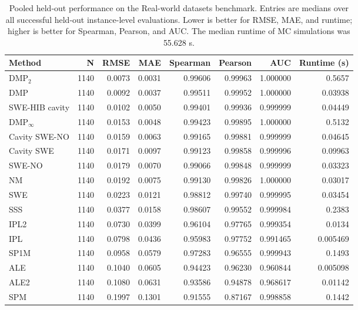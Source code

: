 \begin{table}[t]
\caption{Pooled held-out performance on the Real-world datasets benchmark. Entries are medians over all successful held-out instance-level evaluations. Lower is better for RMSE, MAE, and runtime; higher is better for Spearman, Pearson, and AUC. The median runtime of MC simulations was 55.628 s.}
\label{tab:real_world-pooled-metrics}
\begin{tabular}{lrrrrrrr}
\toprule
Method & N & RMSE & MAE & Spearman & Pearson & AUC & Runtime (s) \\
\midrule
DMP$_2$ & 1140 & 0.0073 & 0.0031 & 0.99606 & 0.99963 & 1.000000 & 0.5657 \\
DMP & 1140 & 0.0092 & 0.0037 & 0.99511 & 0.99952 & 1.000000 & 0.03938 \\
SWE-HIB cavity & 1140 & 0.0102 & 0.0050 & 0.99401 & 0.99936 & 0.999999 & 0.04449 \\
DMP$_{\infty}$ & 1140 & 0.0153 & 0.0048 & 0.99423 & 0.99895 & 1.000000 & 0.5132 \\
Cavity SWE-NO & 1140 & 0.0159 & 0.0063 & 0.99165 & 0.99881 & 0.999999 & 0.04645 \\
Cavity SWE & 1140 & 0.0171 & 0.0097 & 0.99123 & 0.99858 & 0.999996 & 0.09963 \\
SWE-NO & 1140 & 0.0179 & 0.0070 & 0.99066 & 0.99848 & 0.999999 & 0.03323 \\
NM & 1140 & 0.0192 & 0.0075 & 0.99130 & 0.99826 & 1.000000 & 0.03017 \\
SWE & 1140 & 0.0223 & 0.0121 & 0.98812 & 0.99740 & 0.999995 & 0.03454 \\
SSS & 1140 & 0.0377 & 0.0158 & 0.98607 & 0.99552 & 0.999984 & 0.2383 \\
IPL2 & 1140 & 0.0730 & 0.0399 & 0.96104 & 0.97765 & 0.999354 & 0.0134 \\
IPL & 1140 & 0.0798 & 0.0436 & 0.95983 & 0.97752 & 0.991465 & 0.005469 \\
SP1M & 1140 & 0.0958 & 0.0579 & 0.97283 & 0.96555 & 0.999943 & 0.1493 \\
ALE & 1140 & 0.1040 & 0.0605 & 0.94423 & 0.96230 & 0.960844 & 0.005098 \\
ALE2 & 1140 & 0.1080 & 0.0631 & 0.93586 & 0.94878 & 0.968617 & 0.01142 \\
SPM & 1140 & 0.1997 & 0.1301 & 0.91555 & 0.87167 & 0.998858 & 0.1442 \\
\bottomrule
\end{tabular}
\end{table}
